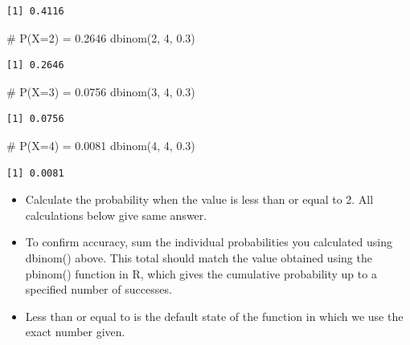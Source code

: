 \documentclass[
  letterpaper,
  DIV=11,
  numbers=noendperiod]{scrreprt}
\newenvironment{Shaded}{\begin{snugshade}}{\end{snugshade}}
\newcommand{\CommentTok}[1]{\textcolor[rgb]{0.37,0.37,0.37}{#1}}
\newcommand{\DecValTok}[1]{\textcolor[rgb]{0.68,0.00,0.00}{#1}}
\newcommand{\FloatTok}[1]{\textcolor[rgb]{0.68,0.00,0.00}{#1}}
\newcommand{\FunctionTok}[1]{\textcolor[rgb]{0.28,0.35,0.67}{#1}}
\newcommand{\NormalTok}[1]{\textcolor[rgb]{0.00,0.23,0.31}{#1}}
\providecommand{\tightlist}{%
  \setlength{\itemsep}{0pt}\setlength{\parskip}{0pt}}\usepackage{longtable,booktabs,array}
\begin{document}
\begin{verbatim}
[1] 0.4116
\end{verbatim}

\begin{Shaded}
\begin{Highlighting}[]
\CommentTok{\# P(X=2) = 0.2646}
\FunctionTok{dbinom}\NormalTok{(}\DecValTok{2}\NormalTok{, }\DecValTok{4}\NormalTok{, }\FloatTok{0.3}\NormalTok{)}
\end{Highlighting}
\end{Shaded}

\begin{verbatim}
[1] 0.2646
\end{verbatim}

\begin{Shaded}
\begin{Highlighting}[]
\CommentTok{\# P(X=3) = 0.0756}
\FunctionTok{dbinom}\NormalTok{(}\DecValTok{3}\NormalTok{, }\DecValTok{4}\NormalTok{, }\FloatTok{0.3}\NormalTok{)}
\end{Highlighting}
\end{Shaded}

\begin{verbatim}
[1] 0.0756
\end{verbatim}

\begin{Shaded}
\begin{Highlighting}[]
\CommentTok{\# P(X=4) = 0.0081}
\FunctionTok{dbinom}\NormalTok{(}\DecValTok{4}\NormalTok{, }\DecValTok{4}\NormalTok{, }\FloatTok{0.3}\NormalTok{)}
\end{Highlighting}
\end{Shaded}

\begin{verbatim}
[1] 0.0081
\end{verbatim}

\begin{itemize}
\tightlist
\item
  Calculate the probability when the value is less than or equal to 2.
  All calculations below give same answer.
\item
  To confirm accuracy, sum the individual probabilities you calculated
  using dbinom() above. This total should match the value obtained using
  the pbinom() function in R, which gives the cumulative probability up
  to a specified number of successes.
\item
  Less than or equal to is the default state of the function in which we
  use the exact number given.
\end{itemize}
\end{document}
